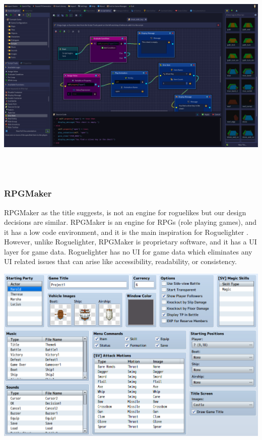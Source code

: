 \documentclass{article}
\begin{document}
\begin{minipage}{\linewidth}
    \centering
    \includegraphics[width=1\textwidth]{rpg-in-a-box-vp.jpg}
\end{minipage}\\\\

\subsubsection{RPGMaker}
RPGMaker as the title suggests, is not an engine for roguelikes but our design decisions are similar. RPGMaker is an engine for RPGs (role playing games), and it has a low code environment, and it is the main inspiration for Roguelighter \cite{rpgmaker}. \\

However, unlike Roguelighter, RPGMaker is proprietary software, and it has a UI layer for game data. Roguelighter has no UI for game data which eliminates any UI related issues that can arise like accessibility, readability, or consistency.\\ 

\begin{minipage}{\linewidth}
    \centering
    \includegraphics[width=1\textwidth]{rpgmaker.png}
\end{minipage}\\\\
\end{document}
